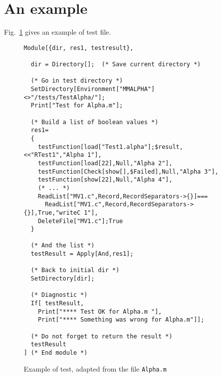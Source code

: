\documentclass[12pt]{article}
\begin{document}
\section{An example}
Fig.~\ref{ex} gives an example of test file. 
\begin{figure}[htbp]
\begin{verbatim}
Module[{dir, res1, testresult},

  dir = Directory[];  (* Save current directory *)

  (* Go in test directory *)
  SetDirectory[Environment["MMALPHA"]<>"/tests/TestAlpha/"];
  Print["Test for Alpha.m"];

  (* Build a list of boolean values *)
  res1= 
  {
    testFunction[load["Test1.alpha"];$result,<<"RTest1","Alpha 1"],
    testFunction[load[22],Null,"Alpha 2"],
    testFunction[Check[show[],$Failed],Null,"Alpha 3"],
    testFunction[show[22],Null,"Alpha 4"],
    (* ... *)
    ReadList["MV1.c",Record,RecordSeparators->{}]===
      ReadList["MV1.c",Record,RecordSeparators->{}],True,"writeC 1"],
    DeleteFile["MV1.c"];True
  }

  (* And the list *)
  testResult = Apply[And,res1];

  (* Back to initial dir *)
  SetDirectory[dir];

  (* Diagnostic *)
  If[ testResult,
    Print["**** Test OK for Alpha.m "],
    Print["**** Something was wrong for Alpha.m"]];

  (* Do not forget to return the result *)
  testResult
] (* End module *)
\end{verbatim}
\caption{Example of test, adapted from the file 
\texttt{Alpha.m}}\label{ex}
\end{figure}
\end{document}
